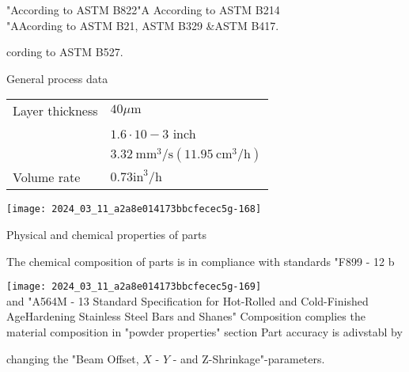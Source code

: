 \documentclass[10pt]{article}
\begin{document}
"According to ASTM B822"A According to ASTM B214\\
"AAcording to ASTM B21, ASTM B329 \&ASTM B417.

cording to ASTM B527.

General process data

\begin{center}
\begin{tabular}{ll}
Layer thickness & $40 \mu \mathrm{m}$ \\
 & $1.6 \cdot 10-3$ inch \\
\hline
 & $3.32 \mathrm{~mm}^{3} / \mathrm{s}\left(11.95 \mathrm{~cm}^{3} / \mathrm{h}\right)$ \\
Volume rate & $0.73 \mathrm{in}^{3} / \mathrm{h}$ \\
\end{tabular}
\end{center}

\begin{center}
\texttt{[image: 2024\_03\_11\_a2a8e014173bbcfecec5g-168]}
\end{center}

Physical and chemical properties of parts

The chemical composition of parts is in compliance with standards "F899 - 12 b

\texttt{[image: 2024\_03\_11\_a2a8e014173bbcfecec5g-169]}\\
and "A564M - 13 Standard Specification for Hot-Rolled and Cold-Finished AgeHardening Stainless Steel Bars and Shanes" Composition complies the material composition in "powder properties" section Part accuracy is adivstabl by

changing the "Beam Offset, $X$ - $Y$ - and Z-Shrinkage"-parameters.
\end{document}
